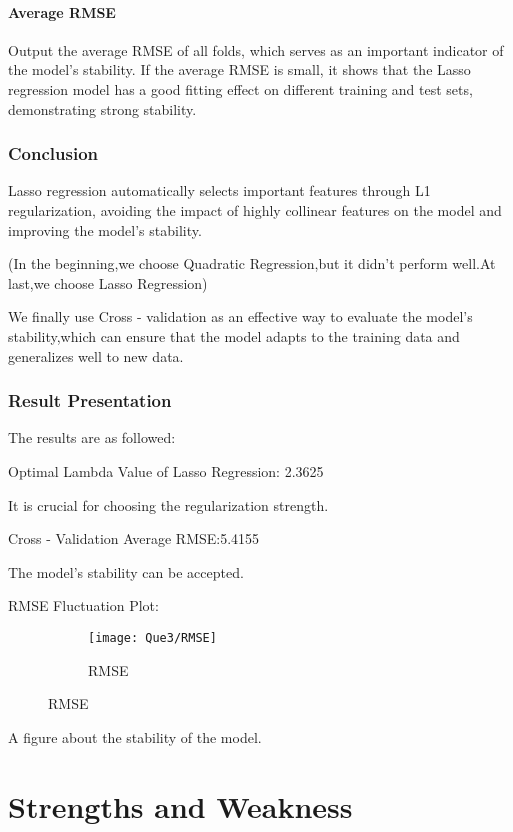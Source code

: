\documentclass[12pt]{article}
\begin{document}
	
	\paragraph{Average RMSE}
	
	Output the average RMSE of all folds, which serves as an important indicator of the model's stability. If the average RMSE is small, it shows that the Lasso regression model has a good fitting effect on different training and test sets, demonstrating strong stability.
	
	\subsubsection{Conclusion}
	Lasso regression automatically selects important features through L1 regularization, avoiding the impact of highly collinear features on the model and improving the model's stability.
	
	(In the beginning,we choose Quadratic Regression,but it didn't perform well.At last,we choose Lasso Regression) 
	
	We finally use Cross - validation as an effective way to evaluate the model's stability,which can ensure that the model adapts to the training data and generalizes well to new data.
	
	\subsubsection{Result Presentation}
	The results are as followed:
	
	Optimal Lambda Value of Lasso Regression: 2.3625
	
	It is crucial for choosing the regularization strength.
	
	Cross - Validation Average RMSE:5.4155
	
	 The model's stability can be accepted.
	 
	RMSE Fluctuation Plot:
			\begin{figure}[H]
		
		\centering
		\begin{subfigure}
			\centering
			\texttt{[image: Que3/RMSE]}
			\caption{RMSE}
			\label{fig:RMSE}
		\end{subfigure}
		
	\end{figure}
	 A figure about the stability of the model.
	\section{Strengths and Weakness}
\end{document}
